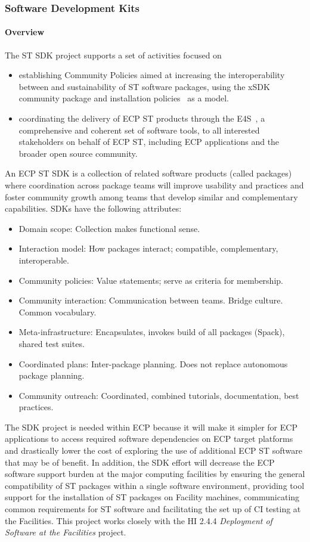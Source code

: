 \subsubsection{ Software Development Kits} \label{subsubsect:ecosystem-sdk}

\paragraph{Overview} The ST SDK project supports a set of activities focused on 
\begin{itemize}
\item establishing Community Policies aimed at increasing the interoperability between and sustainability of ST software packages, using the xSDK~\cite{xsdk:homepage} community package and installation policies~\cite{xsdk-policies:homepage} as a model.
\item coordinating the delivery of ECP ST products through the E4S~\cite{e4s:homepage}, a comprehensive and coherent set of software tools, to all interested stakeholders on behalf of ECP ST, including ECP applications and the broader open source community.
\end{itemize}

An ECP ST SDK is a collection of related software products (called packages) where coordination across package teams will improve usability and practices and foster community growth among teams that develop similar and complementary capabilities.  SDKs have the following attributes:
\begin{itemize}
\item Domain scope: Collection makes functional sense.
\item Interaction model: How packages interact; compatible, complementary, interoperable.
\item Community policies: Value statements; serve as criteria for membership.
\item Community interaction: Communication between teams. Bridge culture. Common vocabulary.
\item Meta-infrastructure: Encapsulates, invokes build of all packages (Spack), shared test suites.
\item Coordinated plans: Inter-package planning. Does not replace autonomous package planning.
\item Community outreach: Coordinated, combined tutorials, documentation, best practices.
\end{itemize}

The SDK project is needed within ECP because it will make it simpler for ECP applications to access required software dependencies on ECP target platforms and drastically lower the cost of exploring the use of additional ECP ST software that may be of benefit. In addition, the SDK effort will decrease the ECP software support burden at the major computing facilities by ensuring the general compatibility of ST packages within a single software environment, providing tool support for the installation of ST packages on Facility machines, communicating common requirements for ST software and facilitating the set up of CI testing at the Facilities. This project works closely with the HI 2.4.4 \textit{Deployment of Software at the Facilities} project.

